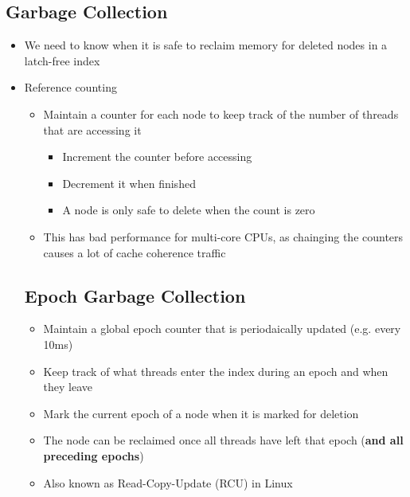 \documentclass[11pt]{article}
\begin{document}
    \subsection*{Garbage Collection}
        \begin{itemize}
            \item We need to know when it is safe to reclaim memory for deleted nodes in a latch-free index
            \item Reference counting
            \begin{itemize}
                \item Maintain a counter for each node to keep track of the number of threads that are accessing it
                \begin{itemize}
                    \item Increment the counter before accessing
                    \item Decrement it when finished
                    \item A node is only safe to delete when the count is zero
                \end{itemize}
                \item This has bad performance for multi-core CPUs, as chainging the counters causes a lot of cache coherence traffic
        \end{itemize}

            \subsection*{Epoch Garbage Collection}
            \begin{itemize}
                \item Maintain a global epoch counter that is periodaically updated (e.g. every 10ms)
                \item Keep track of what threads enter the index during an epoch and when they leave
                \item Mark the current epoch of a node when it is marked for deletion
                \item The node can be reclaimed once all threads have left that epoch (\textbf{and all preceding epochs})
                \item Also known as Read-Copy-Update (RCU) in Linux
            \end{itemize}
            \end{itemize}
\end{document}

